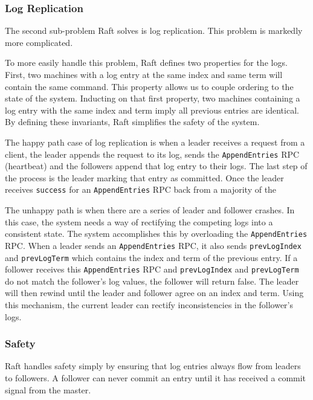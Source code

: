 \subsubsection{Log Replication}

The second sub-problem Raft solves is log replication.
This problem is markedly more complicated.

To more easily handle this problem, Raft defines two properties for the logs.
First, two machines with a log entry at the same index and same term will contain the same command.
This property allows us to couple ordering to the state of the system.
Inducting on that first property, two machines containing a log entry with the same index and term imply all previous entries are identical.
By defining these invariants, Raft simplifies the safety of the system.

The happy path case of log replication is when a leader receives a request from a client, the leader appends the request to its log, sends the \texttt{AppendEntries} RPC (heartbeat) and the followers append that log entry to their logs.
The last step of the process is the leader marking that entry as committed.
Once the leader receives \texttt{success} for an \texttt{AppendEntries} RPC back from a majority of the

The unhappy path is when there are a series of leader and follower crashes.
In this case, the system needs a way of rectifying the competing logs into a consistent state.
The system accomplishes this by overloading the \texttt{AppendEntries} RPC.
When a leader sends an \texttt{AppendEntries} RPC, it also sends \texttt{prevLogIndex} and \texttt{prevLogTerm} which contains the index and term of the previous entry.
If a follower receives this \texttt{AppendEntries} RPC and \texttt{prevLogIndex} and \texttt{prevLogTerm} do not match the follower's log values, the follower will return false.
The leader will then rewind until the leader and follower agree on an index and term.
Using this mechanism, the current leader can rectify inconsistencies in the follower's logs.


\subsubsection{Safety}

Raft handles safety simply by ensuring that log entries always flow from leaders to followers.
A follower can never commit an entry until it has received a commit signal from the master.











